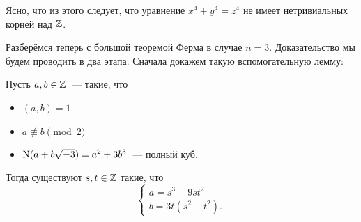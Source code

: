  	Ясно, что из этого следует, что уравнение $x^4 + y^4 = z^4$ не имеет нетривиальных корней над $\mathbb{Z}$.

 	Разберёмся теперь с большой теоремой Ферма в случае $n = 3$. Доказательство мы будем проводить в два этапа. Сначала докажем такую вспомогательную лемму: 
 	
 	\begin{lemma}\label{lemma_LFT_3} 
 		Пусть $a, b \in \mathbb{Z}$~--- такие, что 
 		\begin{itemize}
 			\item $(a, b) = 1$. 
 			\item $a \not\equiv b \pmod{2}$
 			\item $\operatorname{\mathrm{N}}(a + b \sqrt{-3}) = a^2 + 3b^3$~--- полный куб. 
 		\end{itemize}

 		Тогда существуют $s, t \in \mathbb{Z}$ такие, что 
 		\[
 			\begin{cases} 
 				a = s^3 - 9s t^2 \\ b = 3t(s^2 - t^2).
 			\end{cases}
 		\]
 	\end{lemma}
